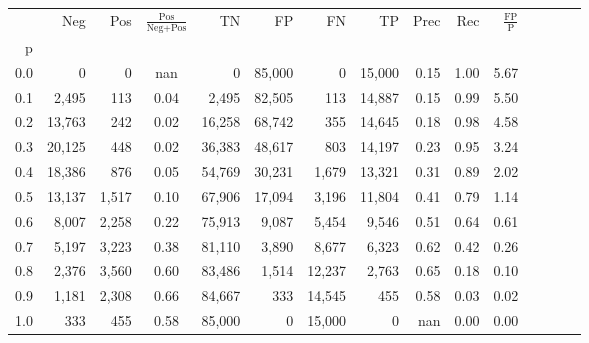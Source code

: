 \begin{tabular}{rrrcrrrrrrrrrrr}
\toprule
{} &     Neg &    Pos & $\frac{\text{Pos}}{\text{Neg}+\text{Pos}}$ &      TN &      FP &      FN &      TP &  Prec &   Rec & $\frac{\text{FP}}{\text{P}}$ \\
p   &         &        &                                            &         &         &         &         &       &       &                              \\
\midrule
0.0 &       0 &      0 &                                        nan &       0 &  85,000 &       0 &  15,000 &  0.15 &  1.00 &                         5.67 \\
0.1 &   2,495 &    113 &                                       0.04 &   2,495 &  82,505 &     113 &  14,887 &  0.15 &  0.99 &                         5.50 \\
0.2 &  13,763 &    242 &                                       0.02 &  16,258 &  68,742 &     355 &  14,645 &  0.18 &  0.98 &                         4.58 \\
0.3 &  20,125 &    448 &                                       0.02 &  36,383 &  48,617 &     803 &  14,197 &  0.23 &  0.95 &                         3.24 \\
0.4 &  18,386 &    876 &                                       0.05 &  54,769 &  30,231 &   1,679 &  13,321 &  0.31 &  0.89 &                         2.02 \\
0.5 &  13,137 &  1,517 &                                       0.10 &  67,906 &  17,094 &   3,196 &  11,804 &  0.41 &  0.79 &                         1.14 \\
0.6 &   8,007 &  2,258 &                                       0.22 &  75,913 &   9,087 &   5,454 &   9,546 &  0.51 &  0.64 &                         0.61 \\
0.7 &   5,197 &  3,223 &                                       0.38 &  81,110 &   3,890 &   8,677 &   6,323 &  0.62 &  0.42 &                         0.26 \\
0.8 &   2,376 &  3,560 &                                       0.60 &  83,486 &   1,514 &  12,237 &   2,763 &  0.65 &  0.18 &                         0.10 \\
0.9 &   1,181 &  2,308 &                                       0.66 &  84,667 &     333 &  14,545 &     455 &  0.58 &  0.03 &                         0.02 \\
1.0 &     333 &    455 &                                       0.58 &  85,000 &       0 &  15,000 &       0 &   nan &  0.00 &                         0.00 \\
\bottomrule
\end{tabular}
